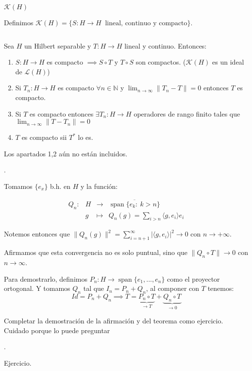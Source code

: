 \documentclass[openany]{book}
\begin{document}
\begin{definition}
    $ \mathcal{K}(H)$

    Definimos $ \mathcal{K}(H) = \{S: H\to H\  \text{ lineal, continuo y compacto}\}$.
\end{definition}


\begin{theorem}
    $ $

    Sea $ H$ un Hilbert separable y $ T:H \to H$ lineal y continuo. Entonces:
    \begin{enumerate}
        \item $ S:H\to H$ es compacto $ \implies S\circ T $ y $ T \circ S$ son compactos. ($ \mathcal{K}(H)$ es un ideal de $ \mathcal{L}(H)$)
        \item Si $ T_n:H \to H$ es compacto $ \forall n \in \mathbb{N}$ y $ \lim_{n \to \infty} \|T_n-T\| = 0 $ entonces $ T $ es compacto.
        \item Si $ T$ es compacto entonces $ \exists T_n:H \to H$ operadores de rango finito tales que $ \lim_{n \to \infty} \|T-T_n\| = 0$
        \item $ T$ es compacto sii $ T^*$ lo es.
    \end{enumerate}
\end{theorem}




\begin{demonstration}
    
Los apartados 1,2 aún no están incluidos.

.

    Tomamos $ \{e_{x}\}$ b.h. en $ H$ y la función:

    $$ 
    \begin{aligned}
        Q_n: & H & \to & \overline{\operatorname{span} \{e_k:\ k>n\}}\\ 
        & g & \mapsto & Q_n(g) = \sum\limits_{i>n}^{} \langle g, e_i \rangle e_i  
    \end{aligned}
    $$

    Notemos entonces que $ \|Q_n(g)\|^2 = \sum\limits_{i=n+1}^{\infty} |\langle g, e_i \rangle|^2 \to 0$ con $ n \to +\infty$.

    Afirmamos que esta convergencia no es solo puntual, sino que $ \|Q_n \circ T\| \to 0$ con $ n \to \infty$. 
    
    Para demostrarlo, definimos $ P_n: H \to \operatorname{span} \{e_1,...,e_n\}$ como el proyector ortogonal. Y tomamos $ Q_n$ tal que $ I_n = P_n+ Q_n$, al componer con $ T$ tenemos:
    $$ Id = P_n+Q_n \implies T = \underbrace{P_n \circ T}_{\to T} + \underbrace{Q_n \circ T}_{ \to 0} $$

    Completar la demostración de la afirmación y del teorema como ejercicio. Cuidado porque lo puede preguntar

    .

    Ejercicio.
\end{demonstration}
\end{document}
